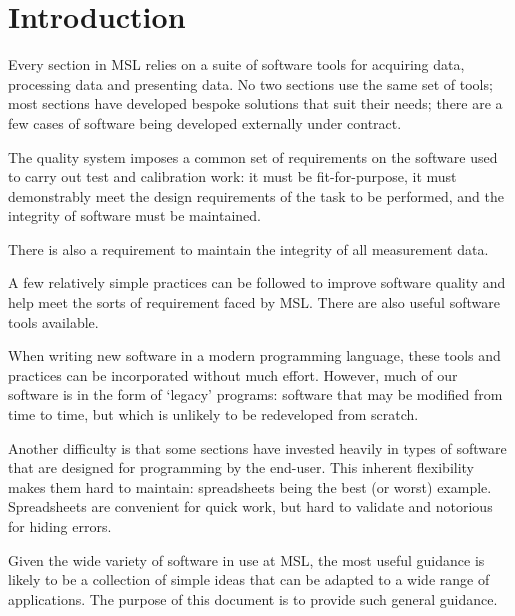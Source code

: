 \section{Introduction}
Every section in MSL relies on a suite of software tools for acquiring data, processing data and presenting data. No two sections use the same set of tools; most sections have developed bespoke solutions that suit their needs; there are a few cases of software being developed externally under contract.  

The quality system imposes a common set of requirements on the software used to carry out test and calibration work: it must be fit-for-purpose, it must demonstrably meet the design requirements of the task to be performed, and the integrity of software must be maintained. 

There is also a requirement to maintain the integrity of all measurement data. 

A few relatively simple practices can be followed to improve software quality and help meet the sorts of requirement faced by MSL. There are also useful software tools available. 

When writing new software in a modern programming language, these tools and practices can be incorporated without much effort. However, much of our software is in the form of `legacy' programs: software that may be modified from time to time, but which is unlikely to be redeveloped from scratch. 

Another difficulty is that some sections have invested heavily in types of software that are designed for programming by the end-user. This inherent flexibility makes them hard to maintain: spreadsheets being the best (or worst) example. Spreadsheets are convenient for quick work, but hard to validate and notorious for hiding errors.

Given the wide variety of software in use at MSL, the most useful guidance is likely to be a collection of simple ideas that can be adapted to a wide range of applications. The purpose of this document is to provide such general guidance.


